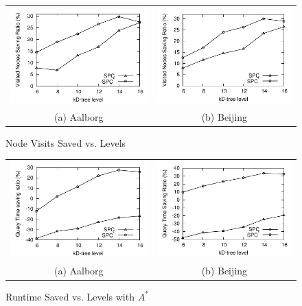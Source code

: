 \begin{figure}[htb]
\center
  \begin{tabular}{@{}c@{ }c@{}}
     \includegraphics[width=0.5\columnwidth]{figures/split_diffnodes_aal_server.pdf}
     &
     \includegraphics[width=0.5\columnwidth]{figures/split_diffnodes_bei_server.pdf}
      \\
     (a) Aalborg & (b)  Beijing
     \end{tabular}
\caption{Node Visits Saved vs. Levels}
\label{fig:levelVsNodesvisited}
\end{figure}


\begin{figure}[htb]
\center
  \begin{tabular}{@{}c@{ }c@{}}
     \includegraphics[width=0.5\columnwidth]{figures/split_diffruntime_aal_server_astar.pdf}
     &
     \includegraphics[width=0.5\columnwidth]{figures/split_diffruntime_bei_server_astar.pdf}
      \\
     (a) Aalborg & (b)  Beijing
     \end{tabular}
\caption{Runtime Saved vs. Levels with $A^*$}
\label{fig:levelVsruntime}
\end{figure}

